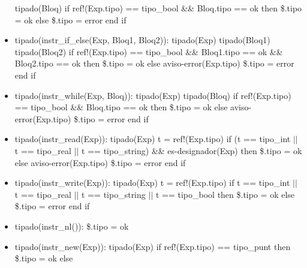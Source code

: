 \documentclass[11pt]{article}
\begin{document}
\begin{itemize}
                \subitem tipado(Bloq)
                \subitem if ref!(Exp.tipo) == tipo\_bool \&\& Bloq.tipo == ok then
                    \subsubitem \$.tipo = ok
                \subitem else
                    \subsubitem \$.tipo = error
                \subitem end if
            \item tipado(instr\_if\_else(Exp, Bloq1, Bloq2)): 
                \subitem tipado(Exp)
                \subitem tipado(Bloq1)
                \subitem tipado(Bloq2)
                \subitem if ref!(Exp.tipo) == tipo\_bool \&\&  Bloq1.tipo == ok \&\&  Bloq2.tipo == ok then
                    \subsubitem \$.tipo = ok
                \subitem else
                    \subsubitem aviso-error(Exp.tipo)
                    \subsubitem \$.tipo = error
                \subitem end if
            \item tipado(instr\_while(Exp, Bloq)): 
                \subitem tipado(Exp)
                \subitem tipado(Bloq)
                \subitem if ref!(Exp.tipo) == tipo\_bool \&\&  Bloq.tipo == ok then
                    \subsubitem \$.tipo = ok
                \subitem else
                    \subsubitem aviso-error(Exp.tipo)
                    \subsubitem \$.tipo = error
                \subitem end if
            \item tipado(instr\_read(Exp)): 
                \subitem tipado(Exp)
                \subitem t = ref!(Exp.tipo)
                \subitem if (t == tipo\_int $\vert \vert$ t == tipo\_real $\vert \vert$ t == tipo\_string) \&\&  es-designador(Exp) then
                    \subsubitem \$.tipo = ok
                \subitem else
                    \subsubitem aviso-error(Exp.tipo)
                    \subsubitem \$.tipo = error
                \subitem end if
            \item tipado(instr\_write(Exp)): 
                \subitem tipado(Exp)
                \subitem t = ref!(Exp.tipo)
                \subitem if t == tipo\_int $\vert \vert$ t == tipo\_real $\vert \vert$ t == tipo\_string $\vert \vert$ t == tipo\_bool then
                    \subsubitem \$.tipo = ok
                \subitem else
                    \subsubitem \$.tipo = error
                \subitem end if
            \item tipado(instr\_nl()): 
                \subitem \$.tipo = ok
            \item tipado(instr\_new(Exp)): 
                \subitem tipado(Exp)
                \subitem if ref!(Exp.tipo) == tipo\_punt then
                    \subsubitem \$.tipo = ok
                \subitem else

\end{itemize}
\end{document}
